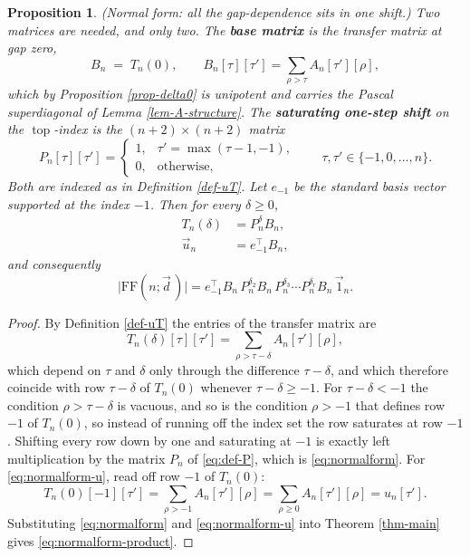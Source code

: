 \documentclass[11pt, a4paper, abstract=yes]{scrartcl}
\theoremstyle{definition}
\theoremstyle{remark}
\theoremstyle{plain}
\newtheorem{proposition}[definition]{Proposition}
\newcommand{\tp}{\operatorname{top}}
\begin{document}
\begin{proposition}
(\emph{Normal form: all the gap-dependence sits in one shift.}) Two matrices are needed, and only two. The
\textbf{base matrix} is the transfer matrix at gap zero,
\begin{equation}\label{eq:def-B}
  B_n\;=\;T_n(0),\qquad B_n[\tau][\tau']=\sum_{\rho>\tau}A_n[\tau'][\rho] ,
\end{equation}
which by Proposition \ref{prop-delta0} is unipotent and carries the Pascal superdiagonal of
Lemma \ref{lem-A-structure}. The \textbf{saturating one-step shift} on the \(\tp\)-index is the
\((n+2)\times(n+2)\) matrix
\begin{equation}\label{eq:def-P}
  P_n[\tau][\tau']=\begin{cases}
    1, & \tau'=\max(\tau-1,-1),\\
    0, & \text{otherwise},
  \end{cases}
  \qquad \tau,\tau'\in\lbrace-1,0,\dots,n\rbrace .
\end{equation}
Both are indexed as in Definition \ref{def-uT}. Let \(e_{-1}\) be the standard basis vector supported at
the index \(-1\). Then for every \(\delta\ge0\),
\begin{align}
  T_n(\delta) &= P_n^{\delta}B_n ,\label{eq:normalform}\\
  \vec u_n    &= e_{-1}^{\!\top}B_n ,\label{eq:normalform-u}
\end{align}
and consequently
\begin{equation}\label{eq:normalform-product}
  \lvert\mathrm{FF}(n;\vec d\,)\rvert
   =e_{-1}^{\!\top}B_n\,P_n^{\delta_2}B_n\,P_n^{\delta_3}\cdots P_n^{\delta_r}B_n\,\vec 1_n .
\end{equation}
\label{prop-normalform}
\end{proposition}

\begin{proof}
By Definition \ref{def-uT} the entries of the transfer matrix are
\begin{equation*}
  T_n(\delta)[\tau][\tau']=\sum_{\rho>\tau-\delta}A_n[\tau'][\rho] ,
\end{equation*}
which depend on \(\tau\) and \(\delta\) only through the difference \(\tau-\delta\), and which
therefore coincide with row \(\tau-\delta\) of \(T_n(0)\) whenever \(\tau-\delta\ge-1\). For
\(\tau-\delta<-1\) the condition \(\rho>\tau-\delta\) is vacuous, and so is the condition
\(\rho>-1\) that defines row \(-1\) of \(T_n(0)\), so instead of running off the index set the row
saturates at row \(-1\). Shifting every row down by one and saturating at \(-1\) is exactly left
multiplication by the matrix \(P_n\) of \eqref{eq:def-P}, which is \eqref{eq:normalform}. For
\eqref{eq:normalform-u}, read off row \(-1\) of \(T_n(0)\):
\begin{equation*}
  T_n(0)[-1][\tau']=\sum_{\rho>-1}A_n[\tau'][\rho]=\sum_{\rho\ge0}A_n[\tau'][\rho]=u_n[\tau'] .
\end{equation*}
Substituting \eqref{eq:normalform} and \eqref{eq:normalform-u} into Theorem \ref{thm-main} gives
\eqref{eq:normalform-product}.
\end{proof}
\end{document}
